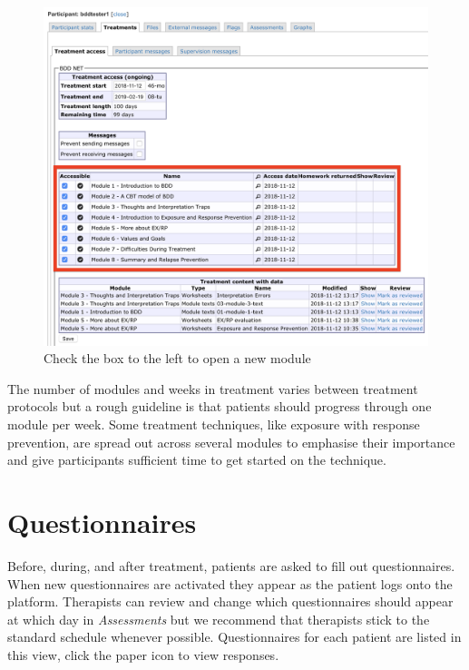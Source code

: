 \documentclass[]{book}
\begin{document}
\begin{figure}
\centering
\includegraphics{images/module-access.png}
\caption{Check the box to the left to open a new module}
\end{figure}

The number of modules and weeks in treatment varies between treatment protocols but a rough guideline is that patients should progress through one module per week. Some treatment techniques, like exposure with response prevention, are spread out across several modules to emphasise their importance and give participants sufficient time to get started on the technique.

\hypertarget{questionnaires}{%
\section{Questionnaires}\label{questionnaires}}

Before, during, and after treatment, patients are asked to fill out questionnaires. When new questionnaires are activated they appear as the patient logs onto the platform. Therapists can review and change which questionnaires should appear at which day in \emph{Assessments} but we recommend that therapists stick to the standard schedule whenever possible. Questionnaires for each patient are listed in this view, click the paper icon to view responses.
\end{document}
